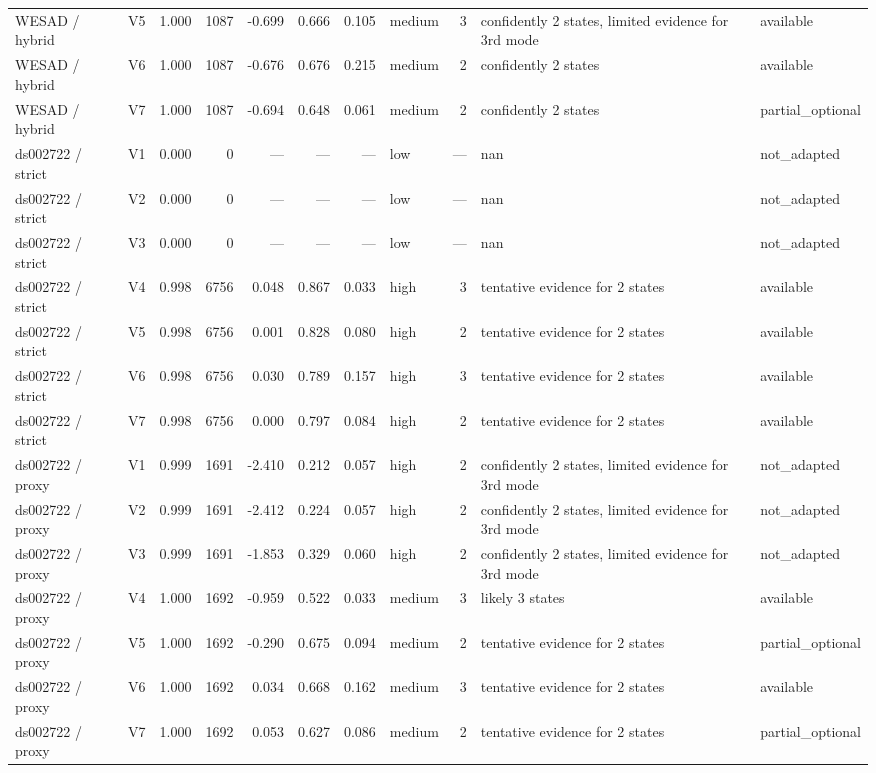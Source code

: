 \documentclass[11pt,a4paper]{article}
\begin{document}
\begin{landscape}
\begin{longtable}{p{2.8cm}p{0.8cm}rrrrrp{1.2cm}rp{4.4cm}p{1.6cm}}
WESAD / hybrid & V5 & 1.000 & 1087 & -0.699 & 0.666 & 0.105 & medium & 3 & confidently 2 states, limited evidence for 3rd mode & available \\
WESAD / hybrid & V6 & 1.000 & 1087 & -0.676 & 0.676 & 0.215 & medium & 2 & confidently 2 states & available \\
WESAD / hybrid & V7 & 1.000 & 1087 & -0.694 & 0.648 & 0.061 & medium & 2 & confidently 2 states & partial\_optional \\
ds002722 / strict & V1 & 0.000 & 0 & --- & --- & --- & low & --- & nan & not\_adapted \\
ds002722 / strict & V2 & 0.000 & 0 & --- & --- & --- & low & --- & nan & not\_adapted \\
ds002722 / strict & V3 & 0.000 & 0 & --- & --- & --- & low & --- & nan & not\_adapted \\
ds002722 / strict & V4 & 0.998 & 6756 & 0.048 & 0.867 & 0.033 & high & 3 & tentative evidence for 2 states & available \\
ds002722 / strict & V5 & 0.998 & 6756 & 0.001 & 0.828 & 0.080 & high & 2 & tentative evidence for 2 states & available \\
ds002722 / strict & V6 & 0.998 & 6756 & 0.030 & 0.789 & 0.157 & high & 3 & tentative evidence for 2 states & available \\
ds002722 / strict & V7 & 0.998 & 6756 & 0.000 & 0.797 & 0.084 & high & 2 & tentative evidence for 2 states & available \\
ds002722 / proxy & V1 & 0.999 & 1691 & -2.410 & 0.212 & 0.057 & high & 2 & confidently 2 states, limited evidence for 3rd mode & not\_adapted \\
ds002722 / proxy & V2 & 0.999 & 1691 & -2.412 & 0.224 & 0.057 & high & 2 & confidently 2 states, limited evidence for 3rd mode & not\_adapted \\
ds002722 / proxy & V3 & 0.999 & 1691 & -1.853 & 0.329 & 0.060 & high & 2 & confidently 2 states, limited evidence for 3rd mode & not\_adapted \\
ds002722 / proxy & V4 & 1.000 & 1692 & -0.959 & 0.522 & 0.033 & medium & 3 & likely 3 states & available \\
ds002722 / proxy & V5 & 1.000 & 1692 & -0.290 & 0.675 & 0.094 & medium & 2 & tentative evidence for 2 states & partial\_optional \\
ds002722 / proxy & V6 & 1.000 & 1692 & 0.034 & 0.668 & 0.162 & medium & 3 & tentative evidence for 2 states & available \\
ds002722 / proxy & V7 & 1.000 & 1692 & 0.053 & 0.627 & 0.086 & medium & 2 & tentative evidence for 2 states & partial\_optional \\

\end{longtable}
\end{landscape}
\end{document}
